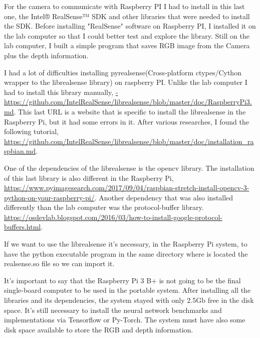     \bigskip
    
    For the camera to communicate with Raspberry PI I had to install in this last one, the Intel® RealSense™ SDK and other libraries that were needed to install the SDK. Before installing "RealSense" software on Raspberry PI, I installed it on the lab computer so that I could better test and explore the library. Still on the lab computer, I built a simple program that saves RGB image from the Camera plus the depth information.
    
    \bigskip
    
    I had a lot of difficulties installing pyrealsense(Cross-platform ctypes/Cython wrapper to the librealsense library) on raspberry PI. Unlike the lab computer I had to install this library manually, \url{-https://github.com/IntelRealSense/librealsense/blob/master/doc/RaspberryPi3.md}. This last URL is a website that is specific to install the librealsense in the Raspberry Pi, but it had some errors in it. After various researches, I found the following tutorial, \url{https://github.com/IntelRealSense/librealsense/blob/master/doc/installation_raspbian.md}. 
    
    \bigskip
    
    One of the dependencies of the librealsense is the opencv library. The installation of this last library is also different in the Raspberry Pi, \url{https://www.pyimagesearch.com/2017/09/04/raspbian-stretch-install-opencv-3-python-on-your-raspberry-pi/}. Another dependency that was also installed differently than the lab computer was the protocol-buffer library. \url{https://osdevlab.blogspot.com/2016/03/how-to-install-google-protocol-buffers.html}.
    
    \bigskip
    
    If we want to use the librealsense it's necessary, in the Raspberry Pi system, to have the python executable program in the same directory where is located the realsense.so file so we can import it. 
    
    \bigskip
    
    It's important to say that the Raspberry Pi 3 B+ is not going to be the final single-board computer to be used in the portable system. After installing all the libraries and its dependencies, the system stayed with only 2.5Gb free in the disk space. It's still necessary to install the neural network benchmarks and implementations via Tensorflow or Py-Torch. The system must have also some disk space available to store the RGB and depth information.
    
